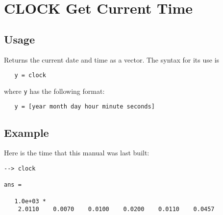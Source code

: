 \section{CLOCK Get Current Time}

\subsection{Usage}

Returns the current date and time as a vector.  The syntax for its use is
\begin{verbatim}
   y = clock
\end{verbatim}
where \verb|y| has the following format:
\begin{verbatim}
   y = [year month day hour minute seconds]
\end{verbatim}
\subsection{Example}

Here is the time that this manual was last built:
\begin{verbatim}
--> clock

ans = 

   1.0e+03 * 
    2.0110    0.0070    0.0100    0.0200    0.0110    0.0457 
\end{verbatim}
